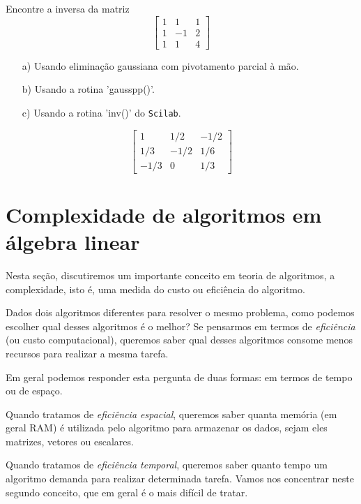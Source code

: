 \ifisscilab
\begin{exer} Encontre a inversa da matriz
$$\left[
\begin{array}{ccc}
1&1&1\\
1&-1&2\\
1&1&4
\end{array}\right]$$
\begin{itemize}
\item[a)] Usando eliminação gaussiana com pivotamento parcial à mão.
\item[b)] Usando a rotina 'gausspp()'.
\item[c)] Usando a rotina 'inv()' do \verb+Scilab+.
\end{itemize}
\end{exer}
\begin{resp}

 $$ \left[ \begin {array}{ccc} 1&1/2&-1/2\\1/3&-1/2&1/6
\\-1/3&0&1/3\end {array} \right] $$

\end{resp}
\fi



\section{Complexidade de algoritmos em álgebra linear}
Nesta seção, discutiremos um importante conceito em teoria de algoritmos, a complexidade, isto é, uma medida do custo ou eficiência do algoritmo.

Dados dois algoritmos diferentes para resolver o mesmo problema, como podemos escolher qual desses algoritmos é o melhor? Se pensarmos em termos de \emph{eficiência} (ou custo computacional), queremos saber qual desses algoritmos consome menos recursos para realizar a mesma tarefa.

Em geral podemos responder esta pergunta de duas formas: em termos de tempo ou de espaço.

Quando tratamos de \emph{eficiência espacial}, queremos saber quanta memória (em geral RAM) é utilizada pelo algoritmo para armazenar os dados, sejam eles matrizes, vetores ou escalares.

Quando tratamos de \emph{eficiência temporal}, queremos saber quanto tempo um algoritmo demanda para realizar determinada tarefa. Vamos nos concentrar neste segundo conceito, que em geral é o mais difícil de tratar.

